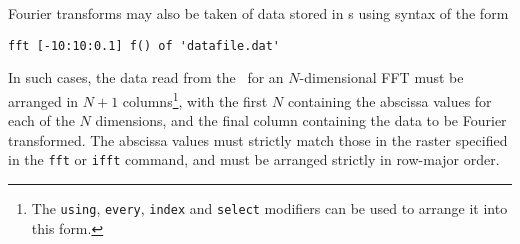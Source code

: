 Fourier transforms may also be taken of data stored in \datafile s using syntax
of the form
\begin{verbatim}
fft [-10:10:0.1] f() of 'datafile.dat'
\end{verbatim}

\noindent In such cases, the data read from the \datafile\ for an
$N$-dimensional FFT must be arranged in $N+1$ columns\footnote{The {\tt using},
{\tt every}, {\tt index} and {\tt select} modifiers can be used to arrange it
into this form.}, with the first $N$ containing the abscissa values for each of
the $N$ dimensions, and the final column containing the data to be Fourier
transformed. The abscissa values must strictly match those in the raster
specified in the {\tt fft} or {\tt ifft} command, and must be arranged strictly
in row-major order.

